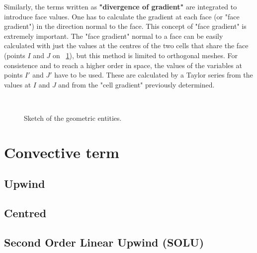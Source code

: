 Similarly, the terms written as \textbf{"divergence of gradient"} are
integrated to introduce face values. One has to calculate the gradient at
each face (or "face gradient") in the direction normal to the face. This
concept of "face gradient" is extremely important. The "face gradient"
normal to a face can be easily calculated with just the values at the
centres of the two cells that share the face (points $I$ and $J$ on 
\figurename~\ref{fig:sketch_internal_external_faces}),%
but this method is limited to orthogonal meshes.
For consistence and to reach a higher order in space, the values of the
variables at points $I'$ and $J'$ have to be used. These are calculated by a
Taylor series from the values at $I$ and $J$ and from the "cell gradient"
previously determined.

\begin{figure}[t]
\centering
\mbox{
 \,
}%
\caption{Sketch of the geometric entities.}
\label{fig:sketch_internal_external_faces}
\end{figure}


\section{Convective term}

\subsection{Upwind}

\subsection{Centred}

\subsection{Second Order Linear Upwind (SOLU)}


